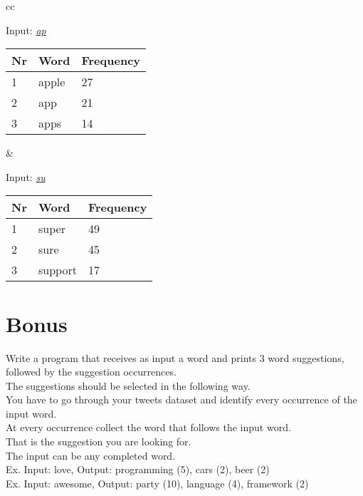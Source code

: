 \documentclass{article}
\begin{document}
        \vspace{2em}

        \begin{tabular}{cc}
          \begin{minipage}{.5\linewidth}
            \hspace{4em}Input: \emph{\underline{ap}}\\
            \begin{tabular}{l|l|l}
              Nr & Word & Frequency \\ \hline
              1 & apple & 27 \\ \hline
              2 & app & 21 \\ \hline
              3 & apps & 14 \\
            \end{tabular}
          \end{minipage} &

          \begin{minipage}{.5\linewidth}
            \hspace{4em}Input: \emph{\underline{su}}\\
            \begin{tabular}{l|l|l}
              Nr & Word & Frequency \\ \hline
              1 & super & 49 \\ \hline
              2 & sure & 45 \\ \hline
              3 & support & 17 \\
            \end{tabular}
          \end{minipage}
        \end{tabular}

    \newpage


    \section{Bonus}
      Write a program that receives as input a word and prints 3 word suggestions,\\
      followed by the suggestion occurrences.\\
      The suggestions should be selected in the following way.\\
      You have to go through your tweets dataset and identify every occurrence
      of the input word.\\
      At every occurrence collect the word that follows the input word.\\
      That is the suggestion you are looking for.\\
      The input can be any completed word.\\
      Ex. Input: \colorbox{black!10!white}{love}, Output: \colorbox{black!10!white}{programming (5), cars (2), beer (2)}\\
      Ex. Input: \colorbox{black!10!white}{awesome}, Output: \colorbox{black!10!white}{party (10), language (4), framework (2)}
\end{document}

